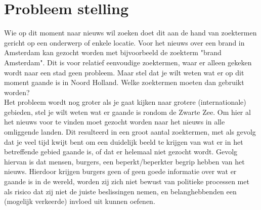 \documentclass[twoside,openright]{uva-bachelor-thesis}
\begin{document}
	\section{Probleem stelling}
		Wie op dit moment naar nieuws wil zoeken doet dit aan de hand van zoektermen gericht op een onderwerp of enkele locatie. Voor het nieuws over een brand in Amsterdam kan gezocht worden met bijvoorbeeld de zoekterm "brand Amsterdam". Dit is voor relatief eenvoudige zoektermen, waar er alleen gekeken wordt naar een stad geen probleem. Maar stel dat je wilt weten wat er op dit moment gaande is in Noord Holland. Welke zoektermen moeten dan gebruikt worden? 
		\\[0.5cm]
		Het probleem wordt nog groter als je gaat kijken naar grotere (internationale) gebieden, stel je wilt weten wat er gaande is rondom de Zwarte Zee. Om hier al het nieuws voor te vinden moet gezocht worden naar het nieuws in alle omliggende landen. Dit resulteerd in een groot aantal zoektermen, met als gevolg dat je veel tijd kwijt bent om een duidelijk beeld te krijgen van wat er in het betreffende gebied gaande is, of dat er helemaal niet gezocht wordt. Gevolg hiervan is dat mensen, burgers, een beperkt/beperkter begrip hebben van het nieuws. Hierdoor krijgen burgers geen of geen goede informatie over wat er gaande is in de wereld, worden zij zich niet bewust van politieke processen met als risico dat zij niet de juiste beslissingen nemen, en belanghebbenden een (mogelijk verkeerde) invloed uit kunnen oefenen.
\end{document}
